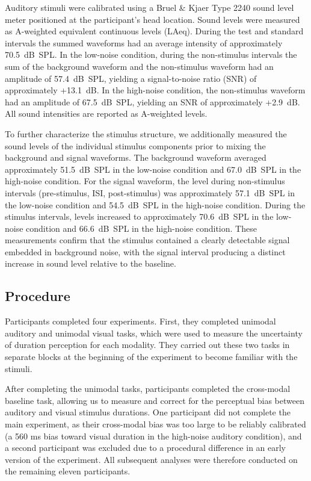 \documentclass{jov}
\begin{document}
Auditory stimuli were calibrated using a Bruel \& Kjaer Type 2240 sound level meter positioned at the participant's head location. Sound levels were measured as A-weighted equivalent continuous levels (LAeq). During the test and standard intervals the summed waveforms had an average intensity of approximately 70.5~dB~SPL. In the low-noise condition, during the non-stimulus intervals the sum of the background waveform and the non-stimulus waveform had an amplitude of 57.4~dB~SPL, yielding a signal-to-noise ratio (SNR) of approximately +13.1~dB. In the high-noise condition, the non-stimulus waveform had an amplitude of 67.5~dB~SPL, yielding an SNR of approximately +2.9~dB. All sound intensities are reported as A-weighted levels.

To further characterize the stimulus structure, we additionally measured the sound levels of the individual stimulus components prior to mixing the background and signal waveforms. The background waveform averaged approximately 51.5~dB~SPL in the low-noise condition and 67.0~dB~SPL in the high-noise condition. For the signal waveform, the level during non-stimulus intervals (pre-stimulus, ISI, post-stimulus) was approximately 57.1~dB~SPL in the low-noise condition and 54.5~dB~SPL in the high-noise condition. During the stimulus intervals, levels increased to approximately 70.6~dB~SPL in the low-noise condition and 66.6~dB~SPL in the high-noise condition. These measurements confirm that the stimulus contained a clearly detectable signal embedded in background noise, with the signal interval producing a distinct increase in sound level relative to the baseline.

\subsection{Procedure}
Participants completed four experiments. First, they completed unimodal auditory and unimodal visual tasks, which were used to measure the uncertainty of duration perception for each modality. They carried out these two tasks in separate blocks at the beginning of the experiment to become familiar with the stimuli. 

After completing the unimodal tasks, participants completed the cross-modal baseline task, allowing us to measure and correct for the perceptual bias between auditory and visual stimulus durations. One participant did not complete the main experiment, as their cross-modal bias was too large to be reliably calibrated (a 560 ms bias toward visual duration in the high-noise auditory condition), and a second participant was excluded due to a procedural difference in an early version of the experiment. All subsequent analyses were therefore conducted on the remaining eleven participants.
\end{document}
